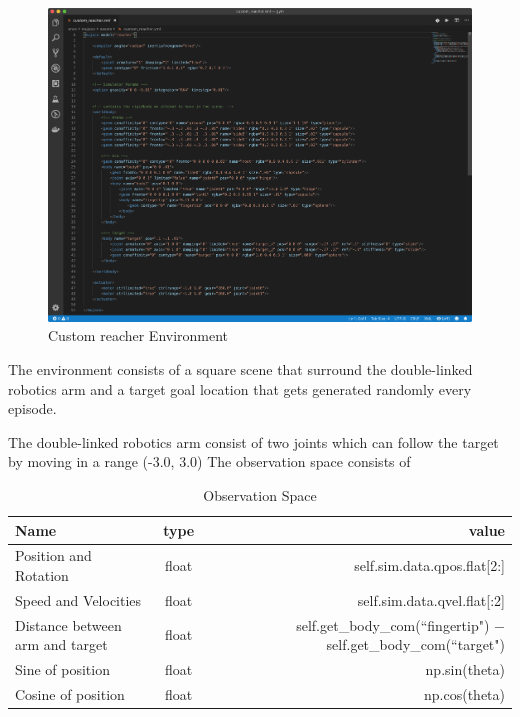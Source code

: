 \begin{figure}[H]%
    \centering
    \includegraphics[width=\linewidth]{figures/envs/custom-reacher-xml.png}%
    \caption{Custom reacher Environment}%
    \label{fig:custom-reacher-xml}%
\end{figure}

The environment consists of a square scene that surround the double-linked robotics arm and a target goal location that gets generated randomly every episode.

The double-linked robotics arm consist of two joints which can follow the target by moving in a range (-3.0, 3.0)
The observation space consists of 

\begin{table}[H]
    \begin{center}
      \begin{tabular}{l|c|r} %
        \textbf{Name} & \textbf{type} & \textbf{value}\\
        \hline
        Position and Rotation & float & self.sim.data.qpos.flat[2:]\\
        Speed and Velocities & float & self.sim.data.qvel.flat[:2]\\
        Distance between arm and target & float & self.get\_body\_com(``fingertip") $-$ self.get\_body\_com(``target")\\
        Sine of position & float & np.sin(theta)\\
        Cosine of position & float & np.cos(theta)\\
      \end{tabular}
      \caption{Observation Space}
      \label{tab:table1}
    \end{center}
  \end{table}

